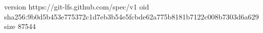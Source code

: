 version https://git-lfs.github.com/spec/v1
oid sha256:9b0d5b453e775372c1d7eb3b54e5fcbde62a775b8181b7122c008b7303d6a629
size 87544
